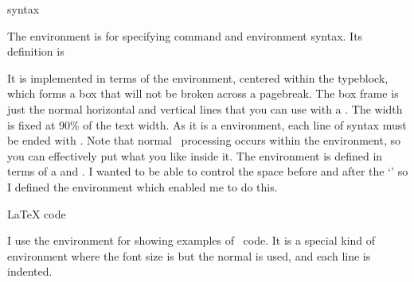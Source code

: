\begin{syntax}
 syntax  \\
\end{syntax}
The  environment is for specifying command and environment
syntax. Its definition is
\begin{lcode}
\newcommand*{\tightcenter}{%
  \topsep=0.25\onelineskip\trivlist \centering\item\relax}
\def\endtigthcenter{\endtrivlist}
\newenvironment{syntax}{\begin{tightcenter}
                        \begin{tabular}{|p{0.9\linewidth}|} \hline}%
                       {\hline
                        \end{tabular}
                        \end{tightcenter}}
\end{lcode}
It is implemented in terms of the  environment, centered within
the typeblock, which forms
a box that will not be broken across a pagebreak. The box frame
is just the normal horizontal and vertical lines that you can use with
a . The width is fixed at 90\% of the text width. As it
is a  environment, each line of syntax must be ended with
\cmd{\\}. Note that normal \ltx\ processing occurs within the 
environment, so you can effectively put what you like inside it.
The  environment is defined in terms of a  and
\cmd{\centering}. I wanted to be able to control the space before and
after the `\cmd{\centering}' so I defined the  environment 
which enabled me to do this.


\begin{syntax}
 LaTeX code  \\
\end{syntax}
I use the  environment for showing examples of \ltx\ code. It
is a special kind of  environment where the font size is
\cmd{\small} but the normal \lnc{\baselineskip} is used, and each line
is indented. 

